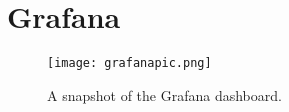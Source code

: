 \section{Grafana}
\label{appendix:grafana}
\begin{figure}[H]
    \begin{center}
        \texttt{[image: grafanapic.png]}
    \end{center}
    \caption{A snapshot of the Grafana dashboard.}
    \label{fig:grafana-dashboard}
\end{figure}
